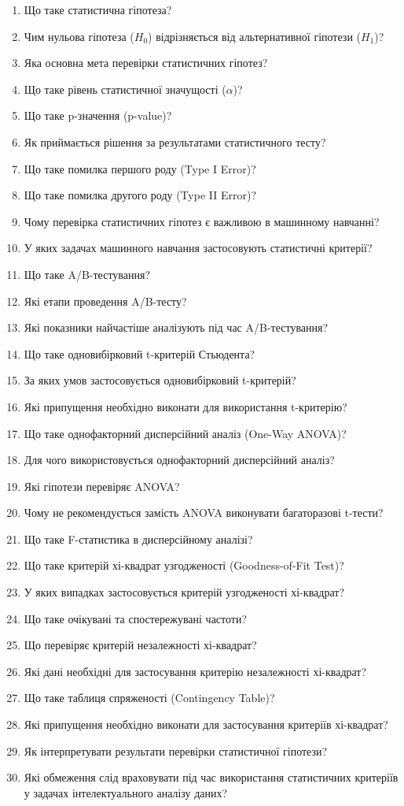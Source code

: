 \begin{enumerate}
\item Що таке статистична гіпотеза?
\item Чим нульова гіпотеза ($H_{0}$) відрізняється від альтернативної гіпотези ($H_{1}$)?
\item Яка основна мета перевірки статистичних гіпотез?
\item Що таке рівень статистичної значущості ($\alpha$)?
\item Що таке p-значення (p-value)?
\item Як приймається рішення за результатами статистичного тесту?
\item Що таке помилка першого роду (Type I Error)?
\item Що таке помилка другого роду (Type II Error)?
\item Чому перевірка статистичних гіпотез є важливою в машинному навчанні?
\item У яких задачах машинного навчання застосовують статистичні критерії?
\item Що таке A/B-тестування?
\item Які етапи проведення A/B-тесту?
\item Які показники найчастіше аналізують під час A/B-тестування?
\item Що таке одновибірковий t-критерій Стьюдента?
\item За яких умов застосовується одновибірковий t-критерій?
\item Які припущення необхідно виконати для використання t-критерію?
\item Що таке однофакторний дисперсійний аналіз (One-Way ANOVA)?
\item Для чого використовується однофакторний дисперсійний аналіз?
\item Які гіпотези перевіряє ANOVA?
\item Чому не рекомендується замість ANOVA виконувати багаторазові t-тести?
\item Що таке F-статистика в дисперсійному аналізі?
\item Що таке критерій хі-квадрат узгодженості (Goodness-of-Fit Test)?
\item У яких випадках застосовується критерій узгодженості хі-квадрат?
\item Що таке очікувані та спостережувані частоти?
\item Що перевіряє критерій незалежності хі-квадрат?
\item Які дані необхідні для застосування критерію незалежності хі-квадрат?
\item Що таке таблиця спряженості (Contingency Table)?
\item Які припущення необхідно виконати для застосування критеріїв хі-квадрат?
\item Як інтерпретувати результати перевірки статистичної гіпотези?
\item Які обмеження слід враховувати під час використання статистичних критеріїв у задачах інтелектуального аналізу даних?
\end{enumerate}
